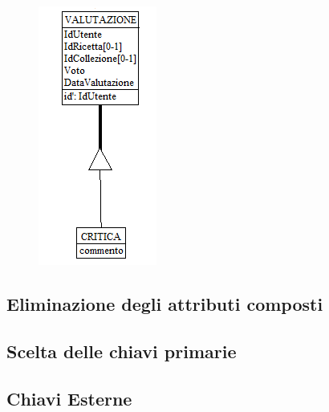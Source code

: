 ﻿\documentclass[a4paper,12pt]{report}
\begin{document}
\begin{figure}[h!]
    \centering
    \includegraphics[width=0.3\linewidth]{app_images/gerarchia_valutazione.png}
\end{figure}
\subsection{Eliminazione degli attributi composti}
\subsection{Scelta delle chiavi primarie}
\subsection{Chiavi Esterne}
\end{document}

